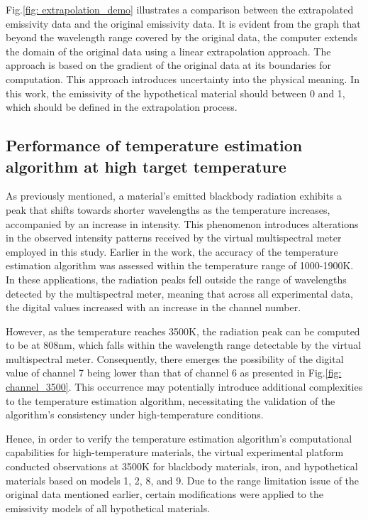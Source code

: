 Fig.\ref{fig: extrapolation_demo} illustrates a comparison between the extrapolated emissivity 
data and the original emissivity data. It is evident from the graph that beyond the wavelength 
range covered by the original data, the computer extends the domain of the original data using a 
linear extrapolation approach. The approach is based on the gradient of the original data at its 
boundaries for computation. This approach introduces uncertainty into the physical meaning. In this 
work, the emissivity of the hypothetical material should between 0 and 1, which should be
defined in the extrapolation process.


\subsection{Performance of temperature estimation algorithm at high target temperature}
As previously mentioned, a material's emitted blackbody radiation exhibits a peak that shifts towards 
shorter wavelengths as the temperature increases, accompanied by an increase in intensity. This 
phenomenon introduces alterations in the observed intensity patterns received by the virtual 
multispectral meter employed in this study. Earlier in the work, the accuracy of the temperature 
estimation algorithm was assessed within the temperature range of 1000-1900K. In these applications, 
the radiation peaks fell outside the range of wavelengths detected by the multispectral meter, 
meaning that across all experimental data, the digital values increased with an increase in the 
channel number.


However, as the temperature reaches 3500K, the radiation peak can be computed to be at 808nm, which 
falls within the wavelength range detectable by the virtual multispectral meter. Consequently, 
there emerges the possibility of the digital value of channel 7 being lower than that of 
channel 6 as presented in Fig.\ref{fig: channel_3500}. This occurrence may potentially introduce additional complexities to the 
temperature estimation algorithm, necessitating the validation of the algorithm's consistency 
under high-temperature conditions.


Hence, in order to verify the temperature estimation algorithm's computational capabilities for 
high-temperature materials, the virtual experimental platform conducted observations at 3500K for 
blackbody materials, iron, and hypothetical materials based on models 1, 2, 8, and 9. 
Due to the range limitation issue of the original data mentioned earlier, certain modifications 
were applied to the emissivity models of all hypothetical materials.


